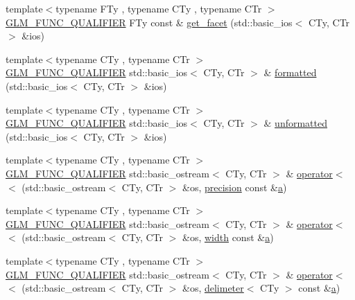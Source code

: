 \begin{DoxyCompactItemize}
\item 
{\footnotesize template$<$typename F\+Ty , typename C\+Ty , typename C\+Tr $>$ }\\\hyperlink{setup_8hpp_a33fdea6f91c5f834105f7415e2a64407}{G\+L\+M\+\_\+\+F\+U\+N\+C\+\_\+\+Q\+U\+A\+L\+I\+F\+I\+ER} F\+Ty const  \& \hyperlink{namespaceglm_1_1io_a9e8927cf032254b0eee4ec650286e1f9}{get\+\_\+facet} (std\+::basic\+\_\+ios$<$ C\+Ty, C\+Tr $>$ \&ios)
\item 
{\footnotesize template$<$typename C\+Ty , typename C\+Tr $>$ }\\\hyperlink{setup_8hpp_a33fdea6f91c5f834105f7415e2a64407}{G\+L\+M\+\_\+\+F\+U\+N\+C\+\_\+\+Q\+U\+A\+L\+I\+F\+I\+ER} std\+::basic\+\_\+ios$<$ C\+Ty, C\+Tr $>$ \& \hyperlink{namespaceglm_1_1io_aa31ec433f6039e5bd35f0f58b37bef83}{formatted} (std\+::basic\+\_\+ios$<$ C\+Ty, C\+Tr $>$ \&ios)
\item 
{\footnotesize template$<$typename C\+Ty , typename C\+Tr $>$ }\\\hyperlink{setup_8hpp_a33fdea6f91c5f834105f7415e2a64407}{G\+L\+M\+\_\+\+F\+U\+N\+C\+\_\+\+Q\+U\+A\+L\+I\+F\+I\+ER} std\+::basic\+\_\+ios$<$ C\+Ty, C\+Tr $>$ \& \hyperlink{namespaceglm_1_1io_a8f950faa7ad67cac1287beaf896a8bb6}{unformatted} (std\+::basic\+\_\+ios$<$ C\+Ty, C\+Tr $>$ \&ios)
\item 
{\footnotesize template$<$typename C\+Ty , typename C\+Tr $>$ }\\\hyperlink{setup_8hpp_a33fdea6f91c5f834105f7415e2a64407}{G\+L\+M\+\_\+\+F\+U\+N\+C\+\_\+\+Q\+U\+A\+L\+I\+F\+I\+ER} std\+::basic\+\_\+ostream$<$ C\+Ty, C\+Tr $>$ \& \hyperlink{namespaceglm_1_1io_ac52a8c5f8ea189f5bae2e5b8e382675f}{operator$<$$<$} (std\+::basic\+\_\+ostream$<$ C\+Ty, C\+Tr $>$ \&os, \hyperlink{structglm_1_1io_1_1precision}{precision} const \&\hyperlink{_s_d_l__opengl__glext_8h_a3309789fc188587d666cda5ece79cf82}{a})
\item 
{\footnotesize template$<$typename C\+Ty , typename C\+Tr $>$ }\\\hyperlink{setup_8hpp_a33fdea6f91c5f834105f7415e2a64407}{G\+L\+M\+\_\+\+F\+U\+N\+C\+\_\+\+Q\+U\+A\+L\+I\+F\+I\+ER} std\+::basic\+\_\+ostream$<$ C\+Ty, C\+Tr $>$ \& \hyperlink{namespaceglm_1_1io_ac4783e4e3b0384619625d5d2d00c27b8}{operator$<$$<$} (std\+::basic\+\_\+ostream$<$ C\+Ty, C\+Tr $>$ \&os, \hyperlink{structglm_1_1io_1_1width}{width} const \&\hyperlink{_s_d_l__opengl__glext_8h_a3309789fc188587d666cda5ece79cf82}{a})
\item 
{\footnotesize template$<$typename C\+Ty , typename C\+Tr $>$ }\\\hyperlink{setup_8hpp_a33fdea6f91c5f834105f7415e2a64407}{G\+L\+M\+\_\+\+F\+U\+N\+C\+\_\+\+Q\+U\+A\+L\+I\+F\+I\+ER} std\+::basic\+\_\+ostream$<$ C\+Ty, C\+Tr $>$ \& \hyperlink{namespaceglm_1_1io_a7c5774d5b7b03ff810042e141d893082}{operator$<$$<$} (std\+::basic\+\_\+ostream$<$ C\+Ty, C\+Tr $>$ \&os, \hyperlink{structglm_1_1io_1_1delimeter}{delimeter}$<$ C\+Ty $>$ const \&\hyperlink{_s_d_l__opengl__glext_8h_a3309789fc188587d666cda5ece79cf82}{a})

\end{DoxyCompactItemize}
